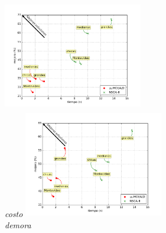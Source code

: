 \begin{columns}[t]
	\centering
		\includegraphics[width=6.075cm,height=4.725cm]{./evaluacion_experimental/tradeoff_maeb_mic/costo}\\
		\small \textit{costo}
	\centering
		\includegraphics[width=6.075cm,height=4.725cm]{./evaluacion_experimental/tradeoff_maeb_mic/demora}\\
		\small \textit{demora}
\end{columns}